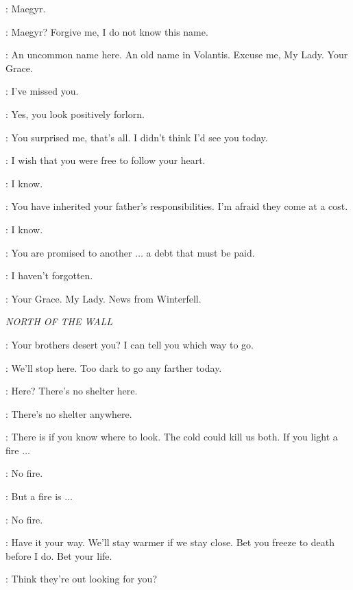 \TALISA: Maegyr. 

\CATELYN: Maegyr? Forgive me, I do not know this name. 

\TALISA: An uncommon name here. An old name in Volantis. Excuse me, My Lady. Your Grace. 

\ROBB: I've missed you. 

\CATELYN: Yes, you look positively forlorn. 

\ROBB: You surprised me, that's all. I didn't think I'd see you today. 

\CATELYN: I wish that you were free to follow your heart. 

\ROBB: I know. 

\CATELYN: You have inherited your father's responsibilities. I'm afraid they come at a cost. 

\ROBB: I know. 

\CATELYN: You are promised to another $\ldots$ a debt that must be paid. 

\ROBB: I haven't forgotten. 


\ROOSE: Your Grace. My Lady. News from Winterfell. 


\scene

\textit{NORTH OF THE WALL} 


\YGRITTE: Your brothers desert you? I can tell you which way to go. 

\JON: We'll stop here. Too dark to go any farther today. 

\YGRITTE: Here? There's no shelter here. 

\JON: There's no shelter anywhere. 

\YGRITTE: There is if you know where to look.   The cold could kill us both. If you light a fire $\ldots$  

\JON: No fire. 

\YGRITTE: But a fire is $\ldots$  

\JON: No fire. 

\YGRITTE: Have it your way.   We'll stay warmer if we stay close. Bet you freeze to death before I do. Bet your life.


\YGRITTE: Think they're out looking for you? 

